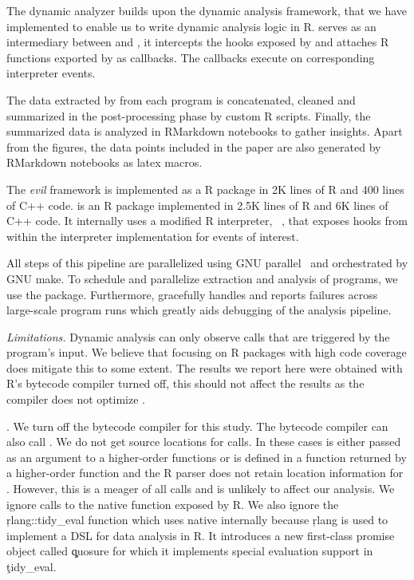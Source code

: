 \documentclass[USenglish,cleveref, autoref, thm-restate]{lipics-v2019}
\newcommand{\mypara}[1]{\medskip\noindent\emph{#1}\xspace}
\begin{document}
The dynamic analyzer builds upon the dynamic analysis framework,
\instrumentr that we have implemented to enable us to write dynamic
analysis logic in R. \instrumentr serves as an intermediary between
\rdyntrace and \evil, it intercepts the hooks exposed by \rdyntrace
and attaches R functions exported by \evil as callbacks. The \evil
callbacks execute on corresponding interpreter events.


The data extracted by \evil from each program is
concatenated, cleaned and summarized in the post-processing phase by
custom R scripts. Finally, the summarized data is analyzed in
RMarkdown notebooks to gather insights. Apart from the figures, the
data points included in the paper are also generated by RMarkdown
notebooks as latex macros.


The \emph{evil} framework is implemented as a R package in 2K lines of
R and 400 lines of C++ code. \instrumentr is an R package implemented
in 2.5K lines of R and 6K lines of C++ code. It internally uses a
modified R interpreter, \rdyntrace~\cite{oopsla19a}, that exposes
hooks from within the interpreter implementation for events of
interest.

All steps of this pipeline are parallelized using GNU
parallel~\cite{GNUparallel} and orchestrated by GNU make. To schedule
and parallelize extraction and analysis of programs, we use the \runr
package. Furthermore, \runr gracefully handles and reports failures
across large-scale program runs which greatly aids debugging of the
analysis pipeline.



\mypara{Limitations.} Dynamic analysis can only observe
calls that are triggered by the program's input. We believe that
focusing on R packages with high code coverage does mitigate this to
some extent. The results we report here were obtained with R's
bytecode compiler turned off, this should not affect the results as
the compiler does not optimize \eval.


. We turn off the
bytecode compiler for this study. The bytecode compiler can also call
\eval. We do not get source locations for \UndefinedEvalsRnd \eval
calls. In these cases \eval is either passed as an argument to a
higher-order functions or is defined in a function returned by a
higher-order function and the R parser does not retain location
information for \eval. However, this is a meager \PercentUndefinedEval
of all \eval calls and is unlikely to affect our analysis. We ignore
calls to the native \eval function exposed by R. We also ignore the
\c{rlang::tidy_eval} function which uses native \eval internally
because \c{rlang} is used to implement a DSL for data analysis in R.
It introduces a new first-class promise object called \c{quosure} for
which it implements special evaluation support in \c{tidy_eval}.
\end{document}
